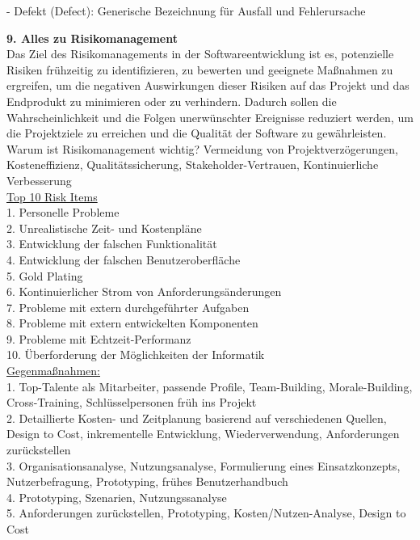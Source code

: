\documentclass{article}
\begin{document}
- Defekt (Defect): Generische Bezeichnung für Ausfall und Fehlerursache\\
\textbf{9. Alles zu Risikomanagement}\\
Das Ziel des Risikomanagements in der Softwareentwicklung ist es, potenzielle Risiken frühzeitig zu identifizieren, zu bewerten und geeignete Maßnahmen zu ergreifen, um die negativen Auswirkungen dieser Risiken auf das Projekt und das Endprodukt zu minimieren oder zu verhindern. Dadurch sollen die Wahrscheinlichkeit und die Folgen unerwünschter Ereignisse reduziert werden, um die Projektziele zu erreichen und die Qualität der Software zu gewährleisten.\\
Warum ist Risikomanagement wichtig? Vermeidung von Projektverzögerungen, Kosteneffizienz, Qualitätssicherung, Stakeholder-Vertrauen, Kontinuierliche Verbesserung\\
\underline{Top 10 Risk Items} \\
1. Personelle Probleme \\
2. Unrealistische Zeit- und Kostenpläne \\
3. Entwicklung der falschen Funktionalität \\
4. Entwicklung der falschen Benutzeroberfläche \\
5. Gold Plating \\
6. Kontinuierlicher Strom von Anforderungsänderungen \\
7. Probleme mit extern durchgeführter Aufgaben \\
8. Probleme mit extern entwickelten Komponenten \\
9. Probleme mit Echtzeit-Performanz \\
10. Überforderung der Möglichkeiten der Informatik \\
\underline{Gegenmaßnahmen:} \\
1. Top-Talente als Mitarbeiter, passende Profile, Team-Building, Morale-Building, Cross-Training, Schlüsselpersonen früh ins Projekt \\
2. Detaillierte Kosten- und Zeitplanung basierend auf verschiedenen Quellen, Design to Cost, inkrementelle Entwicklung, Wiederverwendung, Anforderungen zurückstellen \\
3. Organisationsanalyse, Nutzungsanalyse, Formulierung eines Einsatzkonzepts, Nutzerbefragung, Prototyping, frühes Benutzerhandbuch \\
4. Prototyping, Szenarien, Nutzungssanalyse \\
5. Anforderungen zurückstellen, Prototyping, Kosten/Nutzen-Analyse, Design to Cost \\
\end{document}
